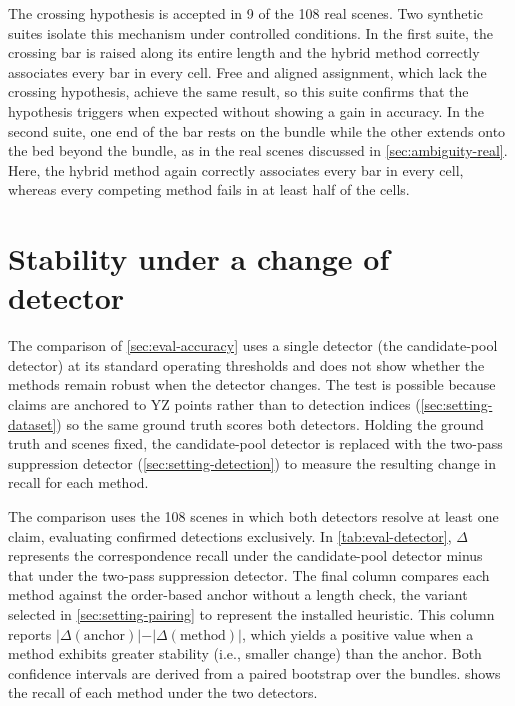 \documentclass[a4paper, 12pt, twoside]{book}
\begin{document}
The crossing hypothesis is accepted in 9 of the 108 real scenes. Two synthetic suites isolate this mechanism under controlled conditions. In the first suite, the crossing bar is raised along its entire length and the hybrid method correctly associates every bar in every cell. Free and aligned assignment, which lack the crossing hypothesis, achieve the same result, so this suite confirms that the hypothesis triggers when expected without showing a gain in accuracy. In the second suite, one end of the bar rests on the bundle while the other extends onto the bed beyond the bundle, as in the real scenes discussed in \cref{sec:ambiguity-real}. Here, the hybrid method again correctly associates every bar in every cell, whereas every competing method fails in at least half of the cells.

\section{Stability under a change of detector}
\label{sec:eval-detector}

The comparison of \cref{sec:eval-accuracy} uses a single detector (the candidate-pool detector) at its standard operating thresholds and does not show whether the methods remain robust when the detector changes. The test is possible because claims are anchored to YZ points rather than to detection indices (\cref{sec:setting-dataset}) so the same ground truth scores both detectors. Holding the ground truth and scenes fixed, the candidate-pool detector is replaced with the two-pass suppression detector (\cref{sec:setting-detection}) to measure the resulting change in recall for each method.

The comparison uses the 108 scenes in which both detectors resolve at least one claim, evaluating confirmed detections exclusively. In \cref{tab:eval-detector}, $\Delta$ represents the correspondence recall under the candidate-pool detector minus that under the two-pass suppression detector. The final column compares each method against the order-based anchor without a length check, the variant selected in \cref{sec:setting-pairing} to represent the installed heuristic. This column reports $\vert{}\Delta(\text{anchor})\vert{} - \vert{}\Delta(\text{method})\vert{}$, which yields a positive value when a method exhibits greater stability (i.e., smaller change) than the anchor. Both confidence intervals are derived from a paired bootstrap over the bundles.  shows the recall of each method under the two detectors.
\end{document}
